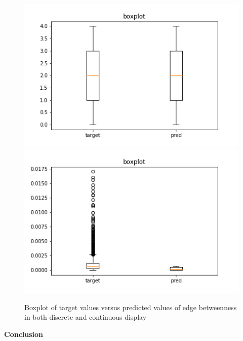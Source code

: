 \begin{figure}[H]
%
  \centering
    \includegraphics[width=0.9\linewidth]{img/GN_exp1/2019-09-28_22-02-08_META1_d4=19_d5=16_hus=10_eus=19_n1us=16_n2us=15_r=100_epochs=20_split-300-4000-10556-_boxplot.png}
\endminipage
{}%
  \centering
    \includegraphics[width=0.9\linewidth]{img/GN_exp1/2019-09-28_22-02-08_META1_d4=19_d5=16_hus=10_eus=19_n1us=16_n2us=15_r=100_epochs=20_split-300-4000-10556-_boxplot_real_eb.png}
\endminipage
\caption{Boxplot of target values versus predicted values of edge betweenness in both discrete and continuous display }\label{fig:edgeb_exp1_boxplot}
\end{figure}



\textbf{Conclusion}

